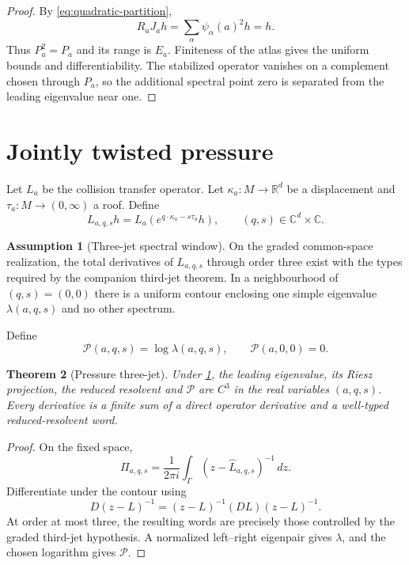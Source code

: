 \documentclass[11pt,reqno]{amsart}
\newtheorem{theorem}{Theorem}[section]
\theoremstyle{definition}
\newtheorem{assumption}[theorem]{Assumption}
\theoremstyle{remark}
\newcommand{\C}{\mathbb C}
\newcommand{\R}{\mathbb R}
\newcommand{\Piop}{\Pi}
\begin{document}
\begin{proof}
By \eqref{eq:quadratic-partition},
\[
 R_aJ_ah=\sum_\alpha\psi_\alpha(a)^2h=h.
\]
Thus $P_a^2=P_a$ and its range is $E_a$.  Finiteness of the atlas gives the
uniform bounds and differentiability.  The stabilized operator vanishes on a
complement chosen through $P_a$, so the additional spectral point zero is
separated from the leading eigenvalue near one.
\end{proof}

\section{Jointly twisted pressure}\label{sec:pressure}

Let $L_a$ be the collision transfer operator.  Let
$\kappa_a:M\to\R^d$ be a displacement and $\tau_a:M\to(0,\infty)$ a roof.
Define
\begin{equation}\label{eq:twist}
 L_{a,q,s}h=L_a\left(e^{q\cdot\kappa_a-s\tau_a}h\right),
 \qquad (q,s)\in\C^d\times\C.
\end{equation}

\begin{assumption}[Three-jet spectral window]\label{ass:window}
On the graded common-space realization, the total derivatives of
$L_{a,q,s}$ through order three exist with the types required by the companion
third-jet theorem.  In a neighbourhood of $(q,s)=(0,0)$ there is a uniform
contour enclosing one simple eigenvalue $\lambda(a,q,s)$ and no other
spectrum.
\end{assumption}

Define
\[
 \mathscr P(a,q,s)=\log\lambda(a,q,s),
 \qquad \mathscr P(a,0,0)=0.
\]

\begin{theorem}[Pressure three-jet]\label{thm:pressure}
Under \cref{ass:window}, the leading eigenvalue, its Riesz projection, the
reduced resolvent and $\mathscr P$ are $C^3$ in the real variables $(a,q,s)$.
Every derivative is a finite sum of a direct operator derivative and a
well-typed reduced-resolvent word.
\end{theorem}

\begin{proof}
On the fixed space,
\[
 \Piop_{a,q,s}=\frac1{2\pi i}\int_\Gamma
 (z-\widehat L_{a,q,s})^{-1}\,dz.
\]
Differentiate under the contour using
\[
 D(z-L)^{-1}=(z-L)^{-1}(DL)(z-L)^{-1}.
\]
At order at most three, the resulting words are precisely those controlled by
the graded third-jet hypothesis.  A normalized left--right eigenpair gives
$\lambda$, and the chosen logarithm gives $\mathscr P$.
\end{proof}
\end{document}
